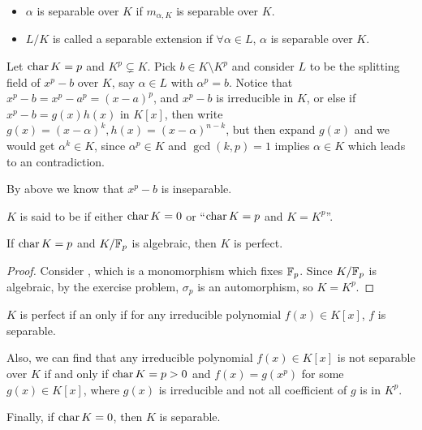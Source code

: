 \begin{definition} \hfill
  \begin{itemize}
    \item $\alpha$ is separable over $K$ if $m_{\alpha, K}$ is separable over $K$.
    \item $L/K$ is called a separable extension if $\forall \alpha \in L$, $\alpha$ is separable over $K$.
  \end{itemize}
\end{definition}

\begin{example}
  Let $\operatorname{char} K = p$ and $K^p \subsetneq K$. Pick $b \in K \setminus K^p$ and consider $L$ to be
  the splitting field of $x^p - b$ over $K$, say $\alpha \in L$ with $\alpha^p = b$.
  Notice that $x^p - b = x^p - a^p = (x - a)^p$, and $x^p - b$ is irreducible in $K$, or else
  if $x^p - b = g(x) h(x)$ in $K[x]$, then write $g(x) = (x - \alpha)^k, h(x) = (x - \alpha)^{n-k}$,
  but then expand $g(x)$ and we would get $\alpha^k \in K$, since $\alpha^p \in K$ and
  $\gcd(k, p) = 1$ implies $\alpha \in K$ which leads to an contradiction.

  By above we know that $x^p - b$ is inseparable.
\end{example}

\begin{definition}
  $K$ is said to be \emph{} if either $\operatorname{char} K = 0$ or ``$\operatorname{char} K = p$ and $K = K^p$''.
\end{definition}

\begin{example}
  If $\operatorname{char} K = p$ and ${K}/{\mathbb{F}_p}$ is algebraic, then $K$ is perfect.

  \begin{proof}
    Consider , which is a monomorphism which fixes $\mathbb{F}_p$.
    Since ${K}/{\mathbb{F}_p}$ is algebraic, by the exercise problem, $\sigma_p$ is an automorphism, so $K = K^p$.
  \end{proof}
\end{example}

\begin{fact}
  $K$ is perfect if an only if for any irreducible polynomial $f(x) \in K[x]$, $f$ is separable.

  Also, we can find that any irreducible polynomial $f(x) \in K[x]$ is not separable over $K$
  if and only if $\operatorname{char} K = p > 0$ and $f(x) = g(x^p)$ for some $g(x) \in K[x]$, where
  $g(x)$ is irreducible and not all coefficient of $g$ is in $K^p$.

  Finally, if $\operatorname{char} K = 0$, then $K$ is separable.
\end{fact}

